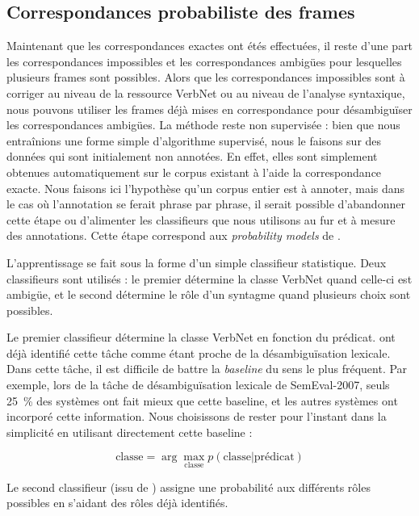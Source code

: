\subsection{Correspondances probabiliste des frames}
\label{subsec:probability}

Maintenant que les correspondances exactes ont étés effectuées, il reste d'une
part les correspondances impossibles et les correspondances ambigües pour
lesquelles plusieurs frames sont possibles. Alors que les correspondances
impossibles sont à corriger au niveau de la ressource VerbNet ou au niveau de
l'analyse syntaxique, nous pouvons utiliser les frames déjà mises en
correspondance pour désambiguïser les correspondances ambigües. La méthode
reste non supervisée : bien que nous entraînions une forme simple d'algorithme
supervisé, nous le faisons sur des données qui sont initialement non annotées.
En effet, elles sont simplement obtenues automatiquement sur le corpus existant
à l'aide la correspondance exacte. Nous faisons ici l'hypothèse qu'un corpus
entier est à annoter, mais dans le cas où l'annotation se ferait phrase par
phrase, il serait possible d'abandonner cette étape ou d'alimenter les
classifieurs que nous utilisons au fur et à mesure des annotations. Cette étape
correspond aux \emph{probability models} de \citet{swier2004unsupervised}.

L'apprentissage se fait sous la forme d'un simple classifieur statistique. Deux
classifieurs sont utilisés : le premier détermine la classe VerbNet quand
celle-ci est ambigüe, et le second détermine le rôle d'un syntagme quand
plusieurs choix sont possibles.

Le premier classifieur détermine la classe VerbNet en fonction du prédicat.
\citet{abend2008supervised} ont déjà identifié cette tâche comme étant proche
de la désambiguïsation lexicale. Dans cette tâche, il est difficile de battre
la \emph{baseline} du sens le plus fréquent. Par exemple, lors de la tâche de
désambiguïsation lexicale de SemEval-2007, seuls 25~\% des systèmes ont fait
mieux que cette baseline, et les autres systèmes ont incorporé cette
information. Nous choisissons de rester pour l'instant dans la simplicité en
utilisant directement cette baseline :

$$ \text{classe} = \arg\max_{\text{classe}} p(\text{classe} \vert \text{prédicat}) $$

Le second classifieur (issu de \cite{swier2004unsupervised}) assigne une
probabilité aux différents rôles possibles en s'aidant des rôles déjà
identifiés.

